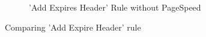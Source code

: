 \documentclass[conference]{IEEEtran}
\begin{document}
\begin{figure}
\begin{subfigure}[b]{\columnwidth}
        \caption{'Add Expires Header' Rule without PageSpeed}
        \label{fig:addexpireheader-nppagespeed}
    \end{subfigure}
    \caption{Comparing 'Add Expire Header' rule}
    \label{fig:addexpireheader-comparison}
\end{figure}

% 
\end{document}

